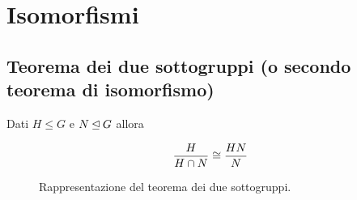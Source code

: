 \chapter{Isomorfismi}

\section[Teorema dei due sottogruppi]{Teorema dei due sottogruppi (o secondo teorema di isomorfismo)}

\begin{teorema}
	\label{thr:due_sottogruppi}
	Dati $H \le G$ e $N \unlhd G$ allora
	
	\begin{equation}
		\dfrac{H}{H \cap N} \cong \dfrac{HN}{N}
	\end{equation}
\end{teorema}
\begin{figure}[tp]
	\centering
	\caption{Rappresentazione del teorema dei due sottogruppi.}
	\label{fig:Isomorfismi_due_sottogruppi}
\end{figure}
